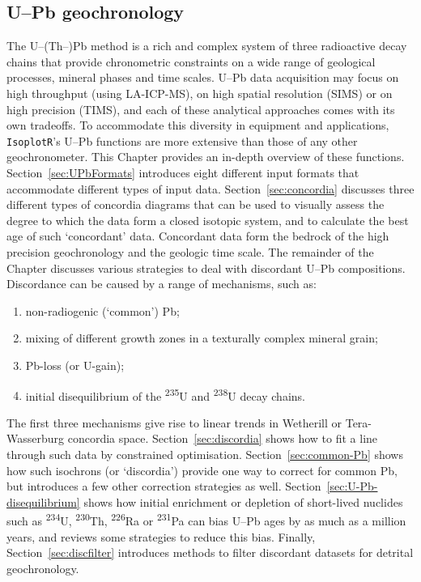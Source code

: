 \begin{refsection}
  
\chapter{U--Pb geochronology}\label{ch:U-Pb}

  The U--(Th--)Pb method is a rich and complex system of three
  radioactive decay chains that provide chronometric constraints on a
  wide range of geological processes, mineral phases and time scales.
  U--Pb data acquisition may focus on high throughput (using
  LA-ICP-MS), on high spatial resolution (SIMS) or on high precision
  (TIMS), and each of these analytical approaches comes with its own
  tradeoffs. To accommodate this diversity in equipment and
  applications, \texttt{IsoplotR}'s U--Pb functions are more extensive
  than those of any other geochronometer. This Chapter provides an
  in-depth overview of these functions.\\

  Section~\ref{sec:UPbFormats} introduces eight different input
  formats that accommodate different types of input
  data. Section~\ref{sec:concordia} discusses three different types of
  concordia diagrams that can be used to visually assess the degree to
  which the data form a closed isotopic system, and to calculate the
  best age of such `concordant' data. Concordant data form the bedrock
  of the high precision geochronology and the geologic time scale.
  The remainder of the Chapter discusses various strategies to deal
  with discordant U--Pb compositions. Discordance can be caused by a
  range of mechanisms, such as:

  \begin{enumerate}
    \item non-radiogenic (`common') Pb;
    \item mixing of different growth zones in a texturally complex
      mineral grain;
    \item Pb-loss (or U-gain);
    \item initial disequilibrium of the \textsuperscript{235}U and
      \textsuperscript{238}U decay chains.
  \end{enumerate}

  The first three mechanisms give rise to linear trends in Wetherill
  or Tera-Wasserburg concordia space. Section~\ref{sec:discordia}
  shows how to fit a line through such data by constrained
  optimisation. Section~\ref{sec:common-Pb} shows how such isochrons
  (or `discordia') provide one way to correct for common Pb, but
  introduces a few other correction strategies as well.
  Section~\ref{sec:U-Pb-disequilibrium} shows how initial enrichment
  or depletion of short-lived nuclides such as \textsuperscript{234}U,
  \textsuperscript{230}Th, \textsuperscript{226}Ra or
  \textsuperscript{231}Pa can bias U--Pb ages by as much as a million
  years, and reviews some strategies to reduce this bias. Finally,
  Section~\ref{sec:discfilter} introduces methods to filter discordant
  datasets for detrital geochronology.


\end{refsection}
